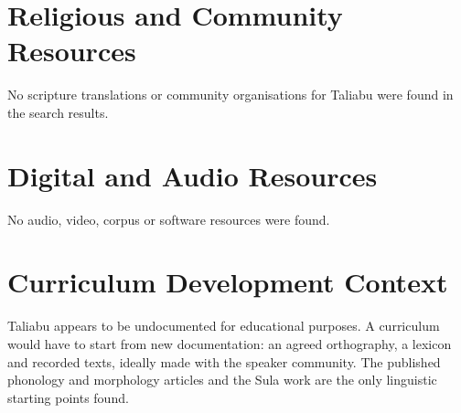 \documentclass[12pt]{article}
\begin{document}
\section{Religious and Community Resources}
No scripture translations or community organisations for Taliabu were found in the search results.

\section{Digital and Audio Resources}
No audio, video, corpus or software resources were found.

\section{Curriculum Development Context}
Taliabu appears to be undocumented for educational purposes. A curriculum would have to start from new documentation: an agreed orthography, a lexicon and recorded texts, ideally made with the speaker community. The published phonology and morphology articles and the Sula work are the only linguistic starting points found.
\end{document}
